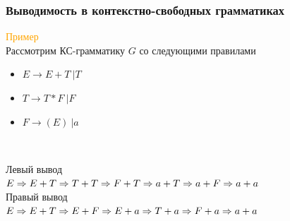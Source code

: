 \documentclass{beamer}
\begin{document}
	\begin{frame}
    \frametitle{Выводимость в контекстно-свободных грамматиках}
    \textcolor{orange}{Пример}\\
    Рассмотрим КС-грамматику $G$ со следующими правилами\\
    \begin{itemize}
        \item $E \rightarrow E + T \ | T$\\
        \item $T \rightarrow T * F \ | F$\\
        \item $F \rightarrow (E) \ | a$\\
    \end{itemize}
    
    \begin{columns}
    \\Левый вывод\\
      $E \Rightarrow E + T \Rightarrow T + T\\ \Rightarrow F + T \Rightarrow a + T \Rightarrow a + F \Rightarrow a + a$
     \\Правый вывод\\
    $E \Rightarrow E + T \Rightarrow E + F\\ \Rightarrow E + a \Rightarrow T + a \Rightarrow F + a \Rightarrow a + a$ 
    

\end{columns}
\end{frame}
\end{document}
